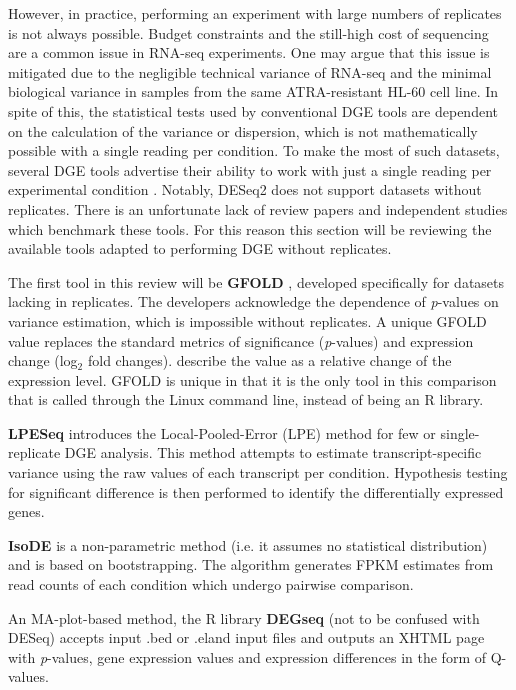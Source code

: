 However, in practice, performing an experiment with large numbers of replicates is not always possible. Budget constraints and the still-high cost of sequencing are a common issue in RNA-seq experiments. One may argue that this issue is mitigated due to the negligible technical variance of RNA-seq \citep{bullard2010evaluation} and the minimal biological variance in samples from the same \ac{ATRA}-resistant HL-60 cell line. In spite of this, the statistical tests used by conventional \ac{DGE} tools are dependent on the calculation of the variance or dispersion, which is not mathematically possible with a single reading per condition. To make the most of such datasets, several \ac{DGE} tools advertise their ability to work with just a single reading per experimental condition \citep{feng2012gfold, gim2016lpeseq, anders2010differential, wang2010degseq, al2014bootstrap}. Notably, DESeq2 does not support datasets without replicates. There is an unfortunate lack of review papers and independent studies which benchmark these tools. For this reason this section will be reviewing the available tools adapted to performing \ac{DGE} without replicates.

The first tool in this review will be \textbf{GFOLD} \citep{feng2012gfold}, developed specifically for datasets lacking in replicates. The developers acknowledge the dependence of \textit{p}-values on variance estimation, which is impossible without replicates. A unique GFOLD value replaces the standard metrics of significance (\textit{p}-values) and expression change (log$_2$ fold changes). \cite{feng2012gfold} describe the value as a relative change of the expression level. GFOLD is unique in that it is the only tool in this comparison that is called through the Linux command line, instead of being an R library.

\textbf{LPESeq} \citep{gim2016lpeseq} introduces the Local-Pooled-Error (LPE) method for few or single-replicate \ac{DGE} analysis. This method attempts to estimate transcript-specific variance using the raw values of each transcript per condition. Hypothesis testing for significant difference is then performed to identify the differentially expressed genes.

\textbf{IsoDE} \citep{al2014bootstrap} is a non-parametric method (i.e. it assumes no statistical distribution) and is based on bootstrapping. The algorithm generates FPKM estimates from read counts of each condition which undergo pairwise comparison.

An MA-plot-based method, the R library \textbf{DEGseq} \citep{wang2010degseq} (not to be confused with DESeq) accepts input .bed or .eland input files and outputs an XHTML page with \textit{p}-values, gene expression values and expression differences in the form of Q-values.

